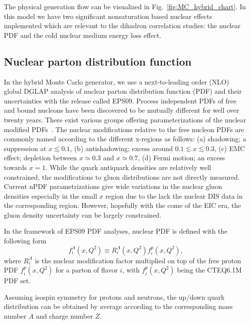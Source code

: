 The physical generation flow can be visualized in Fig.~\ref{fig:MC_hybrid_chart}.
In this model we have two significant nonsaturation based nuclear effects implemented which are relevant to the dihadron correlation studies: the nuclear PDF and the cold nuclear medium energy loss effect.

\subsection{Nuclear parton distribution function}
In the hybrid Monte Carlo generator, we use a next-to-leading order (NLO) global
DGLAP analysis of nuclear parton distribution function (PDF) and their uncertainties with the release called
EPS09. Process independent PDFs of free and bound nucleons
have been discovered to be mutually different for well over twenty years. There
exist various groups offering parameterizations of the nuclear modified PDFs~\cite{Hirai:2004wq,deFlorian:2003qf}.
The nuclear modifications relative to the free nucleon PDFs are commonly named
according to the different x-regions as follows: (a) shadowing; a suppression at
$x\lesssim 0.1$, (b) antishadowing; excess around $0.1\lesssim x \lesssim 0.3$,
(c) EMC effect; depletion between $x\simeq 0.3$ and $x \simeq 0.7$, (d) Fermi
motion; an excess towards $x=1$. While the quark antiquark densities are
relatively well constrained, the modifications to gluon distributions are not
directly measured. Current nPDF parametrizations give wide variations in the
nuclear gluon densities especially in the small $x$ region due to the lack the
nuclear DIS data in the corresponding region. However, hopefully with the come
of the EIC era, the gluon density uncertainty can be largely constrained.

In the framework of EPS09 PDF analyses, nuclear PDF is defined with the following form
\begin{equation}
f^{A}_{i}(x, Q^{2}) \equiv R^{A}_{i}(x, Q^{2})f^{p}_{i}(x, Q^{2}),
\end{equation} 
where $R^{A}_{i}$ is the nuclear modification factor multiplied on top of the
free proton PDF $f^{p}_{i}(x, Q^{2})$ for a parton of flavor $i$, 
with $f^{p}_{i}(x, Q^{2})$ being the CTEQ6.1M PDF set. 


Assuming isospin symmetry for protons and neutrons, the up/down quark
distribution can be obtained by average according to the corresponding mass
number $A$ and charge number $Z$.


